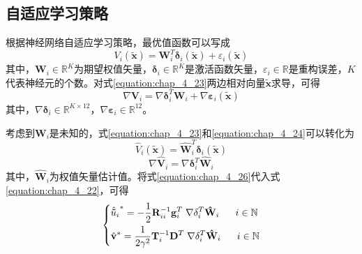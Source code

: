 \subsection{自适应学习策略}
根据神经网络自适应学习策略，最优值函数可以写成
\begin{equation}
  {V_i}\left( {{\mathbf{\tilde x}}} \right) = {\mathbf{W}}_i^T{{\mathbf{\delta }}_i}\left( {{\mathbf{\tilde x}}} \right) + {\varepsilon _i}\left( {{\mathbf{\tilde x}}} \right)
  \label{equation:chap_4_23}
\end{equation}
其中，${{\mathbf{W}}_i} \in {\mathbb{R}^K}$为期望权值矢量，${{\mathbf{\delta }}_i} \in {\mathbb{R}^K}$是激活函数矢量，${\varepsilon _i} \in \mathbb{R}$是重构误差，$K$代表神经元的个数。对式\ref{equation:chap_4_23}两边相对向量${\mathbf{\tilde x}}$求导，可得
\begin{equation}
  \nabla {{\mathbf{V}}_i} = \nabla {\mathbf{\delta }}_i^T{{\mathbf{W}}_i} + \nabla {{\mathbf{\varepsilon }}_i}\left( {{\mathbf{\tilde x}}} \right)
  \label{equation:chap_4_24}
\end{equation}
其中，$\nabla {{\mathbf{\delta }}_i} \in {\mathbb{R}^{K \times 12}}$，$\nabla {{\mathbf{\varepsilon }}_i} \in {\mathbb{R}^{12}}$。

考虑到${{\mathbf{W}}_i}$是未知的，式\ref{equation:chap_4_23}和\ref{equation:chap_4_24}可以转化为
\begin{equation}
  {\hat V_i}\left( \mathbf{\tilde x} \right) = {\mathbf{\hat W}}_i^T{{\mathbf{\delta }}_i}\left( \mathbf{\tilde x} \right)
  \label{equation:chap_4_25}
\end{equation}
\begin{equation}
  \nabla {{\mathbf{\hat V}}_i} = \nabla {\mathbf{\delta }}_i^T{{\mathbf{\hat W}}_i}
  \label{equation:chap_4_26}
\end{equation}
其中，${{\mathbf{\hat W}}_i}$为权值矢量估计值。将式\ref{equation:chap_4_26}代入式\ref{equation:chap_4_22}，可得
\begin{equation}
  \left\{ \begin{gathered}
    {\hat{{\mathbf{\tilde u}}}_i}^*  =  - \frac{1}{2}{\mathbf{R}}_{ii}^{ - 1}{\mathbf{g}}_i^T\;\nabla {\mathbf{\delta }}_i^T{{{\mathbf{\hat W}}}_i}\;\;\;\;\;\;i \in \mathbb{N} \hfill \\
    {\hat{\mathbf{v}}^*} = \frac{1}{{2{\gamma ^2}}}{\mathbf{T}}_i^{ - 1}{{\mathbf{D}}^T}\;\nabla {\mathbf{\delta }}_i^T{{{\mathbf{\hat W}}}_i}\;\;\;\;\;\;i \in \mathbb{N} \hfill \\ 
  \end{gathered}  \right.
  \label{equation:chap_4_27}
\end{equation}

